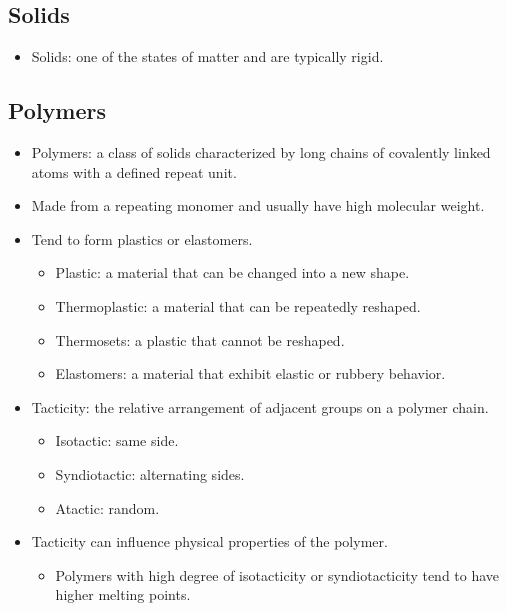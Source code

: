 \documentclass{article}
\begin{document}
\subsection{Solids}

\begin{itemize}
    \item Solids: one of the states of matter and are typically rigid.
\end{itemize}

\subsection{Polymers}

\begin{itemize}
    \item Polymers: a class of solids characterized by long chains of covalently linked atoms with a defined repeat unit.
    \item Made from a repeating monomer and usually have high molecular weight.
    \item Tend to form plastics or elastomers.
    \begin{itemize}
        \item Plastic: a material that can be changed into a new shape.
        \item Thermoplastic: a material that can be repeatedly reshaped.
        \item Thermosets: a plastic that cannot be reshaped.
        \item Elastomers: a material that exhibit elastic or rubbery behavior.
    \end{itemize}
    \item Tacticity: the relative arrangement of adjacent groups on a polymer chain.
    \begin{itemize}
        \item Isotactic: same side.
        \item Syndiotactic: alternating sides.
        \item Atactic: random. 
    \end{itemize}
    \item Tacticity can influence physical properties of the polymer.
    \begin{itemize}
        \item Polymers with high degree of isotacticity or syndiotacticity tend to have higher melting points.
    \end{itemize}
\end{itemize}
\end{document}
